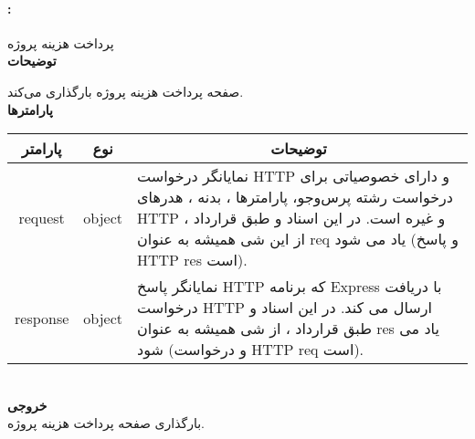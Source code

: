 \paragraph{:}
پرداخت هزینه پروژه
\\
\textbf{توضیحات}
\hr
\begin{flushleft}
	\framebox[.9\textwidth][l]{
		\lr{
			\textcolor{type}{void}
			\textcolor{func}{getInvoiceProject}
			\textcolor{symb}{(}
			\textcolor{type}{object}
			\textcolor{arg}{request}
			\textcolor{symb}{,}
			\textcolor{type}{object}
			\textcolor{arg}{response}
			\textcolor{symb}{);}
		}
	}
\end{flushleft}
صفحه پرداخت هزینه پروژه بارگذاری می‌کند.
\\
\textbf{پارامترها}
\hr \\[10pt]
\begin{tabular}{|m{4cm}|m{3cm}|m{10cm}|}
	\hline
	\multicolumn{1}{|c}{پارامتر}
	&
	\multicolumn{1}{|c}{نوع}
	&
	\multicolumn{1}{|c|}{توضیحات}
	\\
	\hline
	\multicolumn{1}{|c}{request}
	&
	\multicolumn{1}{|c|}{object}
	&
	نمایانگر درخواست HTTP و دارای خصوصیاتی برای درخواست رشته پرس‌و‌جو، پارامترها ، بدنه ، هدرهای HTTP و غیره است.
	در این اسناد و طبق قرارداد ، از این شی همیشه به عنوان req یاد می شود (و پاسخ HTTP res است).
	\\
	\hline
	\multicolumn{1}{|c}{response}
	&
	\multicolumn{1}{|c|}{object}
	&
	نمایانگر پاسخ HTTP که برنامه Express با دریافت درخواست HTTP ارسال می کند.
	در این اسناد و طبق قرارداد ، از شی همیشه به عنوان res یاد می شود (و درخواست HTTP req است).
	\\
	\hline
\end{tabular}
\\[10pt]
\textbf{خروجی}
\hr \\
بارگذاری صفحه پرداخت هزینه پروژه.

